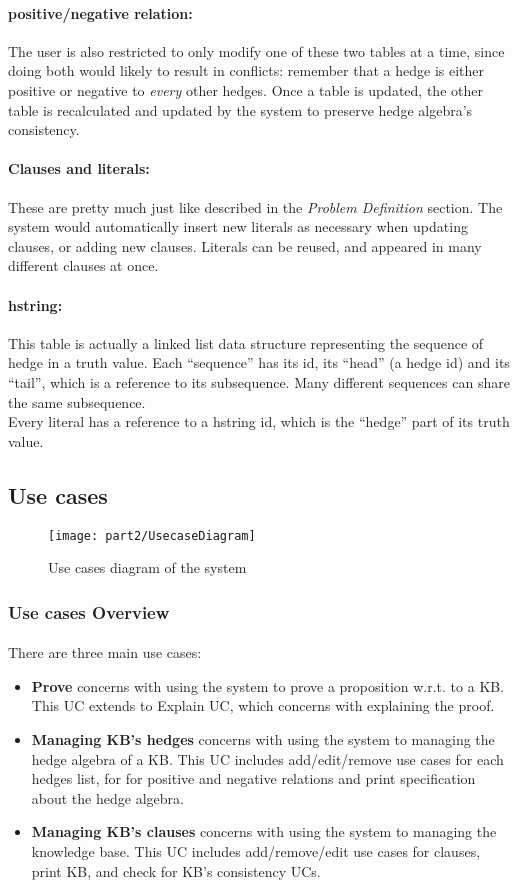 \documentclass[../gr-final.tex]{subfiles}
\begin{document}
\paragraph{positive/negative relation:}
The user is also restricted to only modify one of these two tables at
a time, since doing both would likely to result in conflicts: remember
that a hedge is either positive or negative to {\em every} other
hedges. 
Once a table is updated, the other table is recalculated and updated
by the system to preserve hedge algebra's consistency.
\paragraph{Clauses and literals:}
These are pretty much just like described in the {\em Problem
  Definition} section. The system would automatically insert new
literals as necessary when updating clauses, or adding new
clauses. Literals can be reused, and appeared in many different
clauses at once. 
\paragraph{hstring:}
This table is actually a linked list data structure representing
the sequence of hedge in a truth value. Each ``sequence'' has its id,
its ``head'' (a hedge id) and its ``tail'', which is a reference to
its subsequence. Many different sequences can share the same
subsequence.\\
Every literal has a reference to a hstring id, which is the ``hedge'' part
of its truth value.
\subsection{Use cases}

\begin{figure}[H]
\texttt{[image: part2/UsecaseDiagram]}
\caption{Use cases diagram of the system}
\end{figure}

\subsubsection{Use cases Overview}
\paragraph{} There are three main use cases:
\begin{itemize}
  \item {\bfseries Prove} concerns with using the system to prove
    a proposition w.r.t. to a KB. This UC extends to Explain UC,
    which concerns with explaining the proof.    
  \item {\bfseries Managing KB's hedges} concerns with using the
    system to managing the hedge algebra of a KB. This UC
    includes add/edit/remove use cases for each hedges list, for
    for positive and negative relations and print specification
    about the hedge algebra.
  \item {\bfseries Managing KB's clauses} concerns with using the
    system to managing the knowledge base. This UC includes
    add/remove/edit use cases for clauses, print KB, and check
    for KB's consistency UCs.    
\end{itemize}
\end{document}
